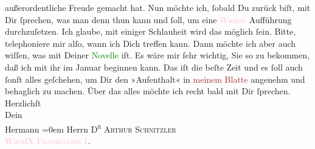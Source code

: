                außerordentliche Freude gemacht hat. Nun möchte ich, ſobald Du zurück biſt, mit Dir
               ſprechen, was man denn thun kann und ſoll, um eine \textcolor{pink}{Wiener}{}\ledrightnote{\textcolor{pink}{Wien}} Aufführung durchzuſetzen. Ich glaube, mit einiger Schlauheit wird das
               möglich ſein. Bitte, telephoniere mir alſo, wann ich Dich {\pb}treffen kann.\pend
           \pstart
           Dann möchte ich aber auch wiſſen, was mit Deiner \textcolor{green}{Novelle}{} iſt. Es wäre mir ſehr wichtig, Sie so zu bekommen,
               daß ich mit ihr im Januar beginnen kann. Das iſt die beſte Zeit und es ſoll auch
               ſonſt alles geſchehen, um Dir den »Aufenthalt« in \textcolor{brown}{meinem Blatte}{} angenehm und behaglich zu machen.\pend
           \pstart
           Über das alles möchte ich recht bald mit Dir ſprechen.\pend
           \pstart
           Herzlichſt{\\[\baselineskip]}Dein{\\[\baselineskip]}\spacefill\mbox{Hermann}\pend
           \leftskip=0em{}\pstart
           \noindent{}Herrn \textsc{D\textsuperscript{r} Arthur Schnitzler}{\\}\textcolor{pink}{Wien}{}\ledrightnote{\textcolor{pink}{Wien}}{ }\textcolor{pink}{IX \textsc{Frankgasse} 1}{}\ledrightnote{\textcolor{pink}{Frankgasse}}.\pend
           \pstart
           \textcolor{gray}{\textbf{\label{T_L00617_1v}\label{T_L00617_1h}}}\pend
           \endnumbering{}  
      